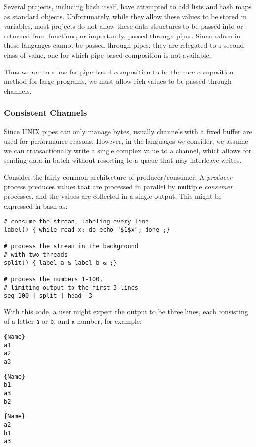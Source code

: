 \documentclass[english,preprint,JIP,uplatex]{ipsj}
\begin{document}
Several projects\cite{haahr,duff}, including bash itself, have attempted to add lists and hash maps as standard objects. Unfortunately, while they allow these values to be stored in variables, most projects do not allow these data structures to be passed into or returned from functions, or importantly, passed through pipes.
Since values in these languages cannot be passed through pipes, they are relegated to a second class of value, one for which pipe-based composition is not available.

Thus we are to allow for pipe-based composition to be the core composition method for large programs, we must allow rich values to be passed through channels.

\subsubsection{Consistent Channels}\noindent
Since UNIX pipes can only manage bytes, usually channels with a fixed buffer are used for performance reasons. However, in the languages we consider, we assume we can transactionally write a single complex value to a channel, which allows for sending data in batch without resorting to a queue that may interleave writes.

Consider the fairly common architecture of producer/consumer: A \emph{producer} process produces values that are processed in parallel by multiple \emph{consumer} processes, and the values are collected in a single output. This might be expressed in bash as:
\noindent\begin{lstlisting}
# consume the stream, labeling every line
label() { while read x; do echo "$1$x"; done ;}

# process the stream in the background
# with two threads
split() { label a & label b & ;}

# process the numbers 1-100,
# limiting output to the first 3 lines
seq 100 | split | head -3
\end{lstlisting}

\noindent
With this code, a user might expect the output to be three lines, each consisting of a letter \verb/a/ or \verb/b/, and a number, for example:

\noindent\begin{minipage}{.14\textwidth}
\begin{lstlisting}{Name}
a1
a2
a3
\end{lstlisting}
\end{minipage}\hfill
\begin{minipage}{.14\textwidth}
\begin{lstlisting}{Name}
b1
a3
b2
\end{lstlisting}
\end{minipage}\hfill
\begin{minipage}{.14\textwidth}
\begin{lstlisting}{Name}
a2
b1
a3
\end{lstlisting}
\end{minipage}
\end{document}
